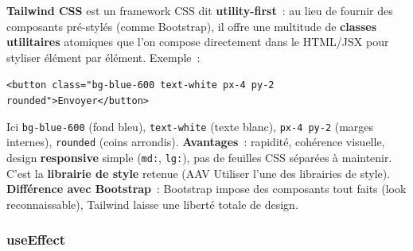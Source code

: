 \noindent \textbf{Tailwind CSS} est un framework CSS dit \textbf{\og{}utility-first\fg{}}~: au lieu de fournir des composants pré-stylés (comme Bootstrap), il offre une multitude de \textbf{classes utilitaires} atomiques que l'on compose directement dans le HTML/JSX pour styliser élément par élément. Exemple~:
\begin{center}
\texttt{<button class="bg-blue-600 text-white px-4 py-2 rounded">Envoyer</button>}
\end{center}
\noindent Ici \texttt{bg-blue-600} (fond bleu), \texttt{text-white} (texte blanc), \texttt{px-4 py-2} (marges internes), \texttt{rounded} (coins arrondis). \textbf{Avantages}~: rapidité, cohérence visuelle, design \textbf{responsive} simple (\texttt{md:}, \texttt{lg:}), pas de feuilles CSS séparées à maintenir. C'est la \textbf{librairie de style} retenue (AAV \og{}Utiliser l'une des librairies de style\fg{}). \textbf{Différence avec Bootstrap}~: Bootstrap impose des composants tout faits (look reconnaissable), Tailwind laisse une liberté totale de design.

\newpage

\subsubsection*{useEffect}
{}

